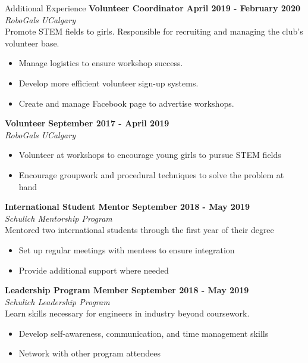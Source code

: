 \documentclass{resume} %
\begin{document}
\medskip
\begin{Entry}{Additional Experience}
{\bf Volunteer Coordinator} \hfill {\bf April 2019 - February 2020}
\\{\em RoboGals UCalgary}
\\ Promote STEM fields to girls. Responsible for recruiting and managing the club's volunteer base.
\begin{itemize} \itemsep -5pt
  \item Manage logistics to ensure workshop success.
  \item Develop more efficient volunteer sign-up systems.
  \item Create and manage Facebook page to advertise workshops.
\end{itemize}

{\bf Volunteer} \hfill {\bf September 2017 - April 2019}
\\{\em RoboGals UCalgary}
\begin{itemize} \itemsep -5pt
  \item Volunteer at workshops to encourage young girls to pursue STEM fields
  \item Encourage groupwork and procedural techniques to solve the problem at hand
\end{itemize}

{\bf International Student Mentor} \hfill {\bf September 2018 - May 2019}
\\{\em Schulich Mentorship Program}
\\ Mentored two international students through the first year of their degree
\begin{itemize} \itemsep -5pt
    \item Set up regular meetings with mentees to ensure integration
    \item Provide additional support where needed
\end{itemize}

{\bf Leadership Program Member} \hfill {\bf September 2018 - May 2019}
\\{\em Schulich Leadership Program}
\\  Learn skills necessary for engineers in industry beyond coursework. 
\begin{itemize} \itemsep -5pt
  \item Develop self-awareness, communication, and time management skills
  \item Network with other program attendees
\end{itemize}
\end{Entry}
\end{document}
